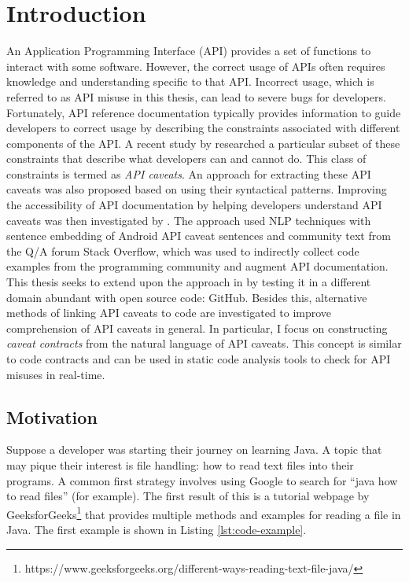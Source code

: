 \chapter{Introduction}
\label{cha:intro}
An Application Programming Interface (API) provides a set of functions to interact with some software. However, the correct usage of APIs often requires knowledge and understanding specific to that API. Incorrect usage, which is referred to as API misuse in this thesis, can lead to severe bugs for developers. Fortunately, API reference documentation typically provides information to guide developers to correct usage by describing the constraints associated with different components of the API. A recent study by \cite{caveat-knowledge-graph} researched a particular subset of these constraints that describe what developers can and cannot do. This class of constraints is termed as \textit{API caveats}. An approach for extracting these API caveats was also proposed based on using their syntactical patterns. Improving the accessibility of API documentation by helping developers understand API caveats was then investigated by \cite{jiamou}. The approach used NLP techniques with sentence embedding of Android API caveat sentences and community text from the Q/A forum Stack Overflow, which was used to indirectly collect code examples from the programming community and augment API documentation. This thesis seeks to extend upon the approach in \cite{jiamou} by testing it in a different domain abundant with open source code: GitHub. Besides this, alternative methods of linking API caveats to code are investigated to improve comprehension of API caveats in general. In particular, I focus on constructing \textit{caveat contracts} from the natural language of API caveats. This concept is similar to code contracts and can be used in static code analysis tools to check for API misuses in real-time. \\

\section{Motivation}
Suppose a developer was starting their journey on learning Java. A topic that may pique their interest is file handling: how to read text files into their programs. A common first strategy involves using Google to search for ``java how to read files'' (for example). The first result of this is a tutorial webpage by GeeksforGeeks\footnote{https://www.geeksforgeeks.org/different-ways-reading-text-file-java/} that provides multiple methods and examples for reading a file in Java. The first example is shown in Listing \ref{lst:code-example}.

